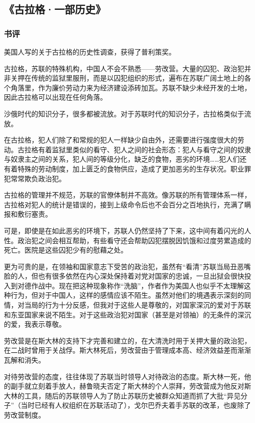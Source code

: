 \subsection{《古拉格·一部历史》}
\subsubsection{书评}

美国人写的关于古拉格的历史性调查，获得了普利策奖。

古拉格，苏联的特殊机构，中国人不会不熟悉——劳改营。大量的囚犯、政治犯并非关押在传统的监狱里服刑，而是以囚犯组织的形式，遍布在苏联广阔土地上的各个角落里，作为廉价劳动力来为经济建设添砖加瓦。苏联不缺少未经开发的土地，因此古拉格可以出现在任何角落。

沙俄时代的知识分子，很多都被流放。对于苏联时代的知识分子，古拉格类似于流放。

在古拉格，犯人们除了和常规的犯人一样缺少自由外，还需要进行强度很大的劳动。古拉格有着监狱里类似的看守、犯人之间的社会形态：犯人与看守之间的奴隶与奴隶主之间的关系，犯人间的等级分化，缺乏的食物，恶劣的环境……犯人们还有着特殊的劳动制度，加上匮乏的食物供应，造成了更加恶劣的生存状况。职业罪犯常常欺负政治犯。

古拉格的管理并不规范，苏联的官僚体制并不高效。像苏联的所有管理体系一样，古拉格对犯人的统计是错误的，接到上级命令后也不会百分之百地执行，充满了瞒报和敷衍塞责。

可是，即使是在如此恶劣的环境下，苏联人仍然坚持了下来，这中间有着闪光的人性。政治犯之间会相互帮助，有些看守还会帮助囚犯摆脱因饥饿和过度劳累造成的死亡。医院是这些囚犯少有的慰藉之处。

更为可贵的是，在领袖和国家意志下受苦的政治犯，虽然有“看清”苏联当局丑恶嘴脸的人，但也有很多依然在内心深处保持着对党对国家的忠诚，一旦出狱会很快投入到对德作战中。现在把这种现象称作“洗脑”，作者作为美国人也似乎不太理解这种行为，但对于中国人，这样的感情应该不陌生。虽然对他们的境遇表示深刻的同情，对当局的行为十分反感，但我对于这些人是尊敬的，对国家深沉的爱对于苏联和东亚国家来说不陌生。对于这些政治犯对国家（甚至是对领袖）的无条件的深沉的爱，我表示尊敬。

劳改营是在斯大林的支持下才完善和建立的，在大清洗时用于关押大量的政治犯，在二战时曾用于关战俘。斯大林死后，劳改营由于管理成本高、经济效益差而渐渐瓦解和消失。

对待劳改营的态度，往往体现了苏联当时领导人对待政治的态度。斯大林一死，他的副手就立刻着手放人，赫鲁晓夫否定了斯大林的个人崇拜，劳改营成为他反对斯大林的工具，随后的苏联领导人为了防止苏联历史被群众知道而抓了大批“异见分子”（当时已经有人权组织在苏联活动了），戈尔巴乔夫着手苏联的改革，也废除了劳改营制度。

